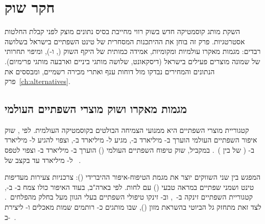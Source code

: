 \chapter{חקר שוק}
\label{ch:market}

השקת מותג קוסמטיקה חדש בשוק רווי מחייבת בסיס נתונים מוצק לפני קבלת החלטות
אסטרטגיות. פרק זה בוחן את ההיתכנות המסחרית של טינט השפתיים  בישראל
בשלושה רבדים: מגמות מאקרו עולמיות ומקומיות, אמידה כמותית של היקף השוק
(,  ו-), ומיפוי תחרותי של שמונה מוצרים פעילים בישראל
(דיסקאונט, שלושה מותגי ביניים וארבעה מותגי פרימיום). הנתונים והמחירים נבדקו מול
דוחות ענף ואתרי מכירה רשמיים, ומבססים את פרק~\ref{ch:alternatives}.

\section{מגמות מאקרו ושוק מוצרי השפתיים העולמי}
\label{sec:market-macro}

קטגוריית מוצרי השפתיים היא ממנועי הצמיחה הבולטים בקוסמטיקה העולמית. לפי
, שוק איפור השפתיים העולמי הוערך ב- מיליארד
ב-, מגיע ל- מיליארד ב-, וצפוי להגיע ל-
מיליארד ב- ( של  בין
)~\cite{grandviewresearch2025lipstick}. במקביל, שוק טיפוח
השפתיים העולמי () הוערך ב- מיליארד ב-
וצפוי לטפס ל- מיליארד עד  בקצב  של
~\cite{grandviewresearch2025lipcare}.

המפגש בין שני השווקים יוצר את מגמת הטיפוח-איפור ההיברידי ():
צרכניות צעירות מעדיפות טינט ושמני שפתיים במראה טבעי () עם
לחות. לפי  בארה"ב, בעוד האיפור כולו צמח ב- ב-,
קטגוריית השפתיים זינקה ב-~\cite{circana2025beauty}, וב-
זינקו טיפולי השפתיים בעלי הגוון מעל  בחלק מהפלחים~\cite{glossy2025lips}.
לצד זאת מתחזק גל הביוטי בהשראת מזון (), שבו מותגים
כ- רותמים שמות מאכלים ו- ליצירת 
ב-~\cite{voguehk2025food,glossy2025lips}.

